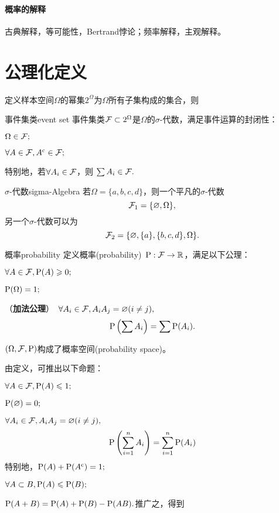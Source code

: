\paragraph{概率的解释}古典解释，等可能性，Bertrand悖论；频率解释，主观解释。

\section{公理化定义}
定义样本空间$\Omega$的幂集$2^\Omega$为$\Omega$所有子集构成的集合，则
\begin{definition}{事件集类}{event set}
	事件集类$\cF\subset 2^\Omega$是$\Omega$的$\sigma$-代数，满足事件运算的封闭性：
	\begin{compactenum}
		\item $\Omega \in \cF;$
		\item $\forall A \in \cF, A\c \in \cF;$
		\item 特别地，若$\forall A_i \in \cF$，则
		$
			\sum A_i \in \cF.
		$
	\end{compactenum}
\end{definition}
\begin{example}{$\sigma$-代数}{sigma-Algebra}
	若$\Omega=\{a,b,c,d\}$，则一个平凡的$\sigma$-代数
	\[
		\cF_1=\{\varnothing, \Omega\},
	\]
	另一个$\sigma$-代数可以为
	\[
		\cF_2=\{\varnothing, \{a\},\{b,c,d\},\Omega\}.
	\]
\end{example}
\begin{definition}{概率}{probability}
	定义概率(probability)~$\P:\cF\to\RR$，满足以下公理：
	\begin{compactenum}
		\item $\forall A\in\cF,\P(A)\geqslant 0;$
		\item $\P (\Omega)=1;$
		\item （\textbf{加法公理}）~$\forall A_i \in \cF,A_iA_j=\varnothing(i\neq j),$
		\begin{align}
			\P\kh{\sum A_i}=\sum\P(A_i).
		\end{align}
	\end{compactenum}
	$(\Omega,\cF,\P)$构成了概率空间(probability space)。
\end{definition}
由定义，可推出以下命题：
\begin{compactenum}
	\item $\forall A\in\cF,\P(A)\leqslant 1;$
	\item $\P(\varnothing)=0;$
	\item $\forall A_i \in \cF,A_iA_j=\varnothing(i\neq j),$
	\[
		\P\kh{\sum_{i=1}^n A_i}=\sum_{i=1}^n\P(A_i)
	\]
	特别地，$\P(A)+\P(A\c)=1;$
	\item $\forall A\subset B,\P(A)\leqslant\P(B);$
	\item $\P(A+B)=\P(A)+\P(B)-\P(AB).$推广之，得到
\end{compactenum}
